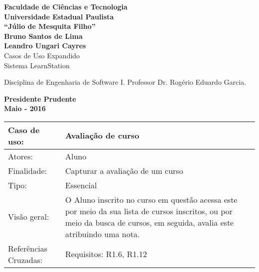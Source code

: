 \documentclass[12pt,a4paper,onecolumn,titlepage]{article}
\begin{document}

\begin{titlepage} %
	
	\vfill
	\begin{center}
	
		{\large \textbf{Faculdade de Ciências e Tecnologia\\Universidade Estadual Paulista\\``Júlio de Mesquita Filho''}} \\[3cm]
		{\large \textbf{Bruno Santos de Lima}}\\
		{\large \textbf{Leandro Ungari Cayres}}\\[4cm]
		{\Large Casos de Uso Expandido}\\
		{\Large Sistema LearnStation}\\[4cm]

	\hspace{.45\textwidth} %
	\begin{minipage}{.5\textwidth}
		\large Disciplina de Engenharia de Software I. Professor Dr. Rogério Eduardo Garcia.\\[0.5cm]
	\end{minipage}

	\vfill
	\vspace{1.5cm}
	
	\large \textbf{Presidente Prudente\\}
	\large \textbf{Maio - 2016}
	
	\end{center}
	
\end{titlepage}

\renewcommand{\baselinestretch}{1.5}

\newpage

\begin{table}[h!]
\begin{center}
\begin{tabular}{p{2.5cm} p{9.5cm}}
Caso de uso: & \textbf{Avaliação de curso} \\ \hline
Atores: & Aluno \\ \hline
Finalidade: & Capturar a avaliação de um curso\\ \hline
Tipo: & Essencial \\ \hline
Visão geral: & O Aluno inscrito no curso em questão acessa este por meio da sua lista de cursos inscritos, ou por meio da busca de cursos, em seguida, avalia este atribuindo uma nota. \\ \hline
Referências Cruzadas: & Requisitos: R1.6, R1.12\\

\end{tabular}
\end{center}
\end{table} 
\end{document}
